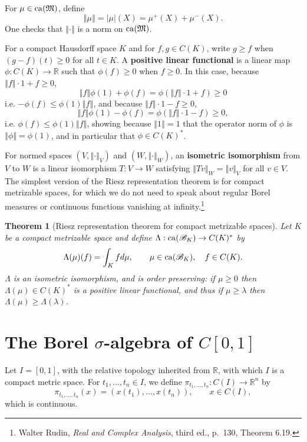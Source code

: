\documentclass{article}
\newcommand{\ca}{\ensuremath\mathrm{ca}}
\newcommand{\norm}[1]{\left\Vert #1 \right\Vert}
\newtheorem{theorem}{Theorem}
\theoremstyle{definition}
\begin{document}
For $\mu \in \ca(\mathfrak{M})$,
 define
\[
\norm{\mu} = |\mu|(X) = \mu^+(X) + \mu^-(X).
\]
One checks that $\norm{\cdot}$ is a norm on $\ca(\mathfrak{M})$.

For a compact Hausdorff space $K$ and
for $f,g \in C(K)$, write $g \geq f$ when $(g-f)(t) \geq 0$ for all $t \in K$. A \textbf{positive linear functional} is a linear map $\phi:C(K) \to \mathbb{R}$ such that
$\phi(f) \geq 0$ when $f \geq 0$. In this case, because $\norm{f}\cdot 1+f \geq 0$,
\[
\norm{f}\phi(1)+\phi(f) = \phi(\norm{f}\cdot 1 + f) \geq 0
\]
i.e. $-\phi(f) \leq \phi(1) \norm{f}$,
and 
because $\norm{f} \cdot 1 - f \geq 0$,
\[
\norm{f}\phi(1)-\phi(f) = \phi(\norm{f}\cdot 1 - f) \geq 0,
\]
i.e. $\phi(f) \leq \phi(1) \norm{f}$, showing because $\norm{1}=1$ that the operator norm of $\phi$ is
$\norm{\phi} = \phi(1)$, and in particular that $\phi \in C(K)^*$. 
 
 For normed spaces $(V,\norm{\cdot}_V)$ and $(W,\norm{\cdot}_W)$, an \textbf{isometric
 isomorphism} from $V$ to $W$ is a linear isomorphism $T:V \to W$ satisfying $\norm{Tv}_W = 
 \norm{v}_V$ for all $v \in V$. The simplest version of the Riesz representation theorem is for compact
 metrizable spaces, for which we do not need to speak about regular Borel measures or continuous functions vanishing at infinity.\footnote{Walter
 Rudin, {\em Real and Complex Analysis}, third ed., p.~130, Theorem 6.19.}


\begin{theorem}[Riesz representation theorem for compact metrizable spaces]
Let $K$ be a compact metrizable space and define $\Lambda:\ca(\mathscr{B}_K) \to C(K)^*$ by 
\[
\Lambda(\mu)(f) = \int_K f d\mu,\qquad \mu \in \ca(\mathscr{B}_K),\quad f \in C(K).
\]
$\Lambda$ is an isometric isomorphism, and is order preserving: if $\mu \geq 0$ then $\Lambda(\mu) \in C(K)^*$ is a positive linear functional, and thus
if $\mu \geq \lambda$ then $\Lambda(\mu) \geq \Lambda(\lambda)$. 
\end{theorem}




\section{The Borel $\sigma$-algebra of $C[0,1]$}
Let $I=[0,1]$, with the relative topology inherited from $\mathbb{R}$, with which $I$ is a compact metric space.
For $t_1,\ldots,t_n \in I$, we define $\pi_{t_1,\ldots,t_n}:C(I) \to \mathbb{R}^n$ by
\[
\pi_{t_1,\ldots,t_n}(x)=(x(t_1),\ldots,x(t_n)), \qquad x \in C(I),
\]
which is continuous.
\end{document}

